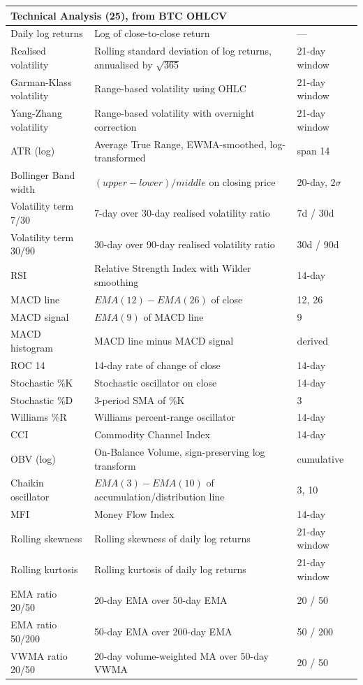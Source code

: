 \documentclass[12pt,a4paper,oneside]{article}
\begin{document}
\begin{longtable}{p{3.5cm}p{7cm}p{2.5cm}}
\multicolumn{3}{l}{\textbf{Technical Analysis (25), from BTC OHLCV}} \\
\midrule
Daily log returns & Log of close-to-close return & --- \\
Realised volatility & Rolling standard deviation of log returns, annualised by $\sqrt{365}$ & 21-day window \\
Garman-Klass volatility & Range-based volatility using OHLC \citep{garman_klass_1980} & 21-day window \\
Yang-Zhang volatility & Range-based volatility with overnight correction \citep{yang_zhang_2000} & 21-day window \\
ATR (log) & Average True Range, EWMA-smoothed, log-transformed & span 14 \\
Bollinger Band width & $(upper - lower) / middle$ on closing price & 20-day, $2\sigma$ \\
Volatility term 7/30 & 7-day over 30-day realised volatility ratio & 7d / 30d \\
Volatility term 30/90 & 30-day over 90-day realised volatility ratio & 30d / 90d \\
RSI & Relative Strength Index with Wilder smoothing & 14-day \\
MACD line & $EMA(12) - EMA(26)$ of close & 12, 26 \\
MACD signal & $EMA(9)$ of MACD line & 9 \\
MACD histogram & MACD line minus MACD signal & derived \\
ROC 14 & 14-day rate of change of close & 14-day \\
Stochastic \%K & Stochastic oscillator on close & 14-day \\
Stochastic \%D & 3-period SMA of \%K & 3 \\
Williams \%R & Williams percent-range oscillator & 14-day \\
CCI & Commodity Channel Index & 14-day \\
OBV (log) & On-Balance Volume, sign-preserving log transform & cumulative \\
Chaikin oscillator & $EMA(3) - EMA(10)$ of accumulation/distribution line & 3, 10 \\
MFI & Money Flow Index & 14-day \\
Rolling skewness & Rolling skewness of daily log returns & 21-day window \\
Rolling kurtosis & Rolling kurtosis of daily log returns & 21-day window \\
EMA ratio 20/50 & 20-day EMA over 50-day EMA & 20 / 50 \\
EMA ratio 50/200 & 50-day EMA over 200-day EMA & 50 / 200 \\
VWMA ratio 20/50 & 20-day volume-weighted MA over 50-day VWMA & 20 / 50 \\


\end{longtable}
\end{document}
